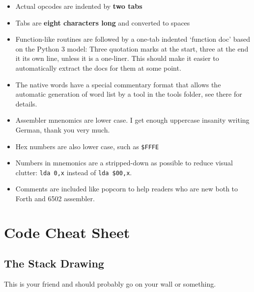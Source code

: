 \begin{itemize}

        \item Actual opcodes are indented by \textbf{two tabs}

        \item Tabs are \textbf{eight characters long} and converted to spaces

        \item Function-like routines are followed by a one-tab indented
                `function doc' based on the Python 3 model: Three
                quotation marks at the start, three at the end it its own line,
                unless it is a one-liner. This should make it easier to
                automatically extract the docs for them at some point.

        \item The native words have a special commentary format that allows the
                automatic generation of word list by a tool in the tools folder,
                see there for details.

        \item Assembler mnenomics are lower case. I get enough uppercase
                insanity writing German, thank you very much.

        \item Hex numbers are also lower case, such as \texttt{\$FFFE}

        \item Numbers in mnemonics are a stripped-down as possible to reduce
                visual clutter: \texttt{lda 0,x} instead of \texttt{lda \$00,x}.

        \item Comments are included like popcorn to help readers who are new
                both to Forth and 6502 assembler.

\end{itemize}


\section{Code Cheat Sheet}

\subsection{The Stack Drawing}
This is your friend and should probably go on your wall or something.


